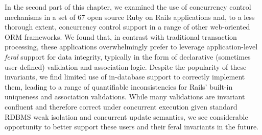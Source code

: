In the second part of this chapter, we examined the use of concurrency
control mechanisms in a set of 67 open source Ruby on Rails
applications and, to a less thorough extent, concurrency control
support in a range of other web-oriented ORM frameworks. We found
that, in contrast with traditional transaction processing, these
applications overwhelmingly prefer to leverage application-level
\textit{feral} support for data integrity, typically in the form of
declarative (sometimes user-defined) validation and association
logic. Despite the popularity of these invariants, we find limited use
of in-database support to correctly implement them, leading to a range
of quantifiable inconsistencies for Rails' built-in uniqueness and
association validations. While many validations are invariant
confluent and therefore correct under concurrent execution given
standard RDBMS weak isolation and concurrent update semantics, we see
considerable opportunity to better support these users and their feral
invariants in the future.


